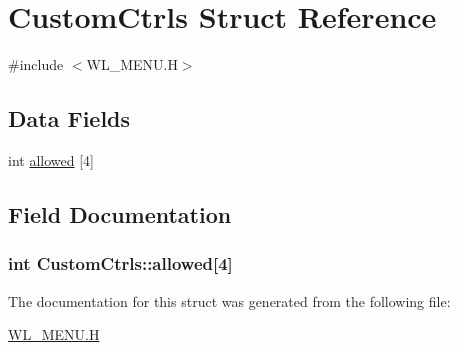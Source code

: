 \hypertarget{structCustomCtrls}{
\section{CustomCtrls Struct Reference}
\label{structCustomCtrls}
}


{\ttfamily \#include $<$WL\_\-MENU.H$>$}

\subsection*{Data Fields}
\begin{DoxyCompactItemize}
\item 
int \hyperlink{structCustomCtrls_aa0c9e8532c13f1a665ef70b035e38790}{allowed} \mbox{[}4\mbox{]}
\end{DoxyCompactItemize}


\subsection{Field Documentation}
\hypertarget{structCustomCtrls_aa0c9e8532c13f1a665ef70b035e38790}{
\subsubsection[{allowed}]{\setlength{\rightskip}{0pt plus 5cm}int {\bf CustomCtrls::allowed}\mbox{[}4\mbox{]}}}
\label{structCustomCtrls_aa0c9e8532c13f1a665ef70b035e38790}


The documentation for this struct was generated from the following file:\begin{DoxyCompactItemize}
\item 
\hyperlink{WL__MENU_8H}{WL\_\-MENU.H}\end{DoxyCompactItemize}
